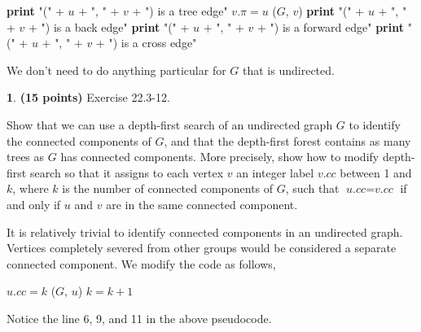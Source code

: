 \documentclass[11pt]{article}
\theoremstyle{definition}
\theoremstyle{theorem}
\newtheorem{prob}{}
\newcommand{\solution}{\medskip\noindent{\color{DarkBlue}\textbf{Solution:}}}
\begin{document}
\begin{algorithmic}[1]
			\State \textbf{print} "(" + $u$ + ", " + $v$ + ") is a tree edge"
			\State $v.\pi = u$
			\State {}($G$, $v$) 
			\State \textbf{print} "(" + $u$ + ", " + $v$ + ") is a back edge"
		\Else  {}
            		 
            			\State \textbf{print} "(" + $u$ + ", " + $v$ + ") is a forward edge"
            		\Else
            			\State \textbf{print} "(" + $u$ + ", " + $v$ + ") is a cross edge"
            		\EndIf
		\EndIf
	\EndFor
\EndFunction
\end{algorithmic}

We don't need to do anything particular for $G$ that is undirected.

\newpage
\begin{prob} \textbf{(15 points)} Exercise 22.3-12.
\end{prob}

Show that we can use a depth-first search of an undirected graph $G$ to identify the connected components of $G$, and that the depth-first forest contains as many trees as $G$ has connected components. More precisely, show how to modify depth-first search so that it assigns to each vertex $v$ an integer label $\textit{v.cc}$ between 1 and $k$, where $k$ is the number of connected components of $G$, such that $\textit{u.cc} = \textit{v.cc}$ if and only if $u$ and $v$ are in the same connected component.

\solution

It is relatively trivial to identify connected components in an undirected graph. Vertices completely severed from other groups would be considered a separate connected component. We modify the code as follows,

\begin{algorithmic}[1]
	\EndFor
		 
			\State $\textit{u.cc} = k$
			\State {}($G$, $u$) 
			\State $k = k + 1$
		\EndIf
	\EndFor
\EndFunction
\end{algorithmic}
Notice the line 6, 9, and 11 in the above pseudocode.
\end{document}
